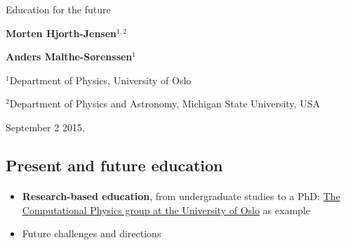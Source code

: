 \documentclass[%
twoside,                 %
final,                   %
10pt]{article}
\begin{document}






\thispagestyle{empty}

\begin{center}
{\LARGE\bf
\begin{spacing}{1.25}
Education for the future
\end{spacing}
}
\end{center}


\begin{center}
{\bf Morten Hjorth-Jensen${}^{1, 2}$} \\ [0mm]
\end{center}

    
\begin{center}
{\bf Anders Malthe-Sørenssen${}^{1}$} \\ [0mm]
\end{center}

    \begin{center}
\centerline{{\small ${}^1$Department of Physics, University of Oslo}}
\centerline{{\small ${}^2$Department of Physics and Astronomy, Michigan State University, USA}}
\end{center}
    

\begin{center} %
September 2 2015,
\end{center}

\vspace{1cm}


\subsection{Present and future education}

\paragraph{}

\begin{itemize}
\item \textbf{Research-based education}, from undergraduate studies to a PhD: \href{{http://www.mn.uio.no/fysikk/english/research/groups/computational/index.html}}{The Computational Physics group at the University of Oslo} as example

\item Future challenges and directions
\end{itemize}
\end{document}
